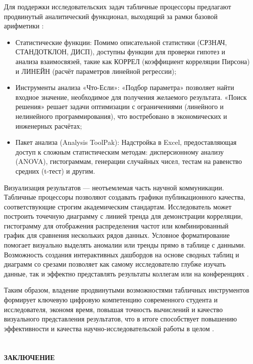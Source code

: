 \documentclass{SibFU-docs}
\begin{document}
Для поддержки исследовательских задач табличные процессоры предлагают продвинутый аналитический функционал, выходящий за рамки базовой арифметики \cite{winston_excel_data_analysis_2016, albright2021analytics}:

\begin{itemize}[label=-]
    \item Статистические функции: Помимо описательной статистики (СРЗНАЧ, СТАНДОТКЛОН, ДИСП), доступны функции для проверки гипотез и анализа взаимосвязей, такие как КОРРЕЛ (коэффициент корреляции Пирсона) и ЛИНЕЙН (расчёт параметров линейной регрессии);
    \item Инструменты анализа «Что-Если»: «Подбор параметра» позволяет найти входное значение, необходимое для получения желаемого результата. «Поиск решения» решает задачи оптимизации с ограничениями (линейного и нелинейного программирования), что востребовано в экономических и инженерных расчётах;
    \item Пакет анализа (Analysis ToolPak): Надстройка в Excel, предоставляющая доступ к сложным статистическим методам: дисперсионному анализу (ANOVA), гистограммам, генерации случайных чисел, тестам на равенство средних (t-тест) и другим.
\end{itemize}

Визуализация результатов --- неотъемлемая часть научной коммуникации. Табличные процессоры позволяют создавать графики публикационного качества, соответствующие строгим академическим стандартам. Исследователь может построить точечную диаграмму с линией тренда для демонстрации корреляции, гистограмму для отображения распределения частот или комбинированный график для сравнения нескольких рядов данных. Условное форматирование помогает визуально выделять аномалии или тренды прямо в таблице с данными. Возможность создания интерактивных дашбордов на основе сводных таблиц и диаграмм со срезами позволяет как самому исследователю глубже изучать данные, так и эффектно представлять результаты коллегам или на конференциях \cite{alexander_excel_charts_2016, bullen2020data}.

Таким образом, владение продвинутыми возможностями табличных инструментов формирует ключевую цифровую компетенцию современного студента и исследователя, экономя время, повышая точность вычислений и качество визуального представления результатов, что в итоге способствует повышению эффективности и качества научно-исследовательской работы в целом \cite{ivanova2023research, sidorov2022education}.

\newpage
\section*{}
\vspace*{-2.5em}
\begin{center}\textbf{ЗАКЛЮЧЕНИЕ}\end{center}
{}
\end{document}
